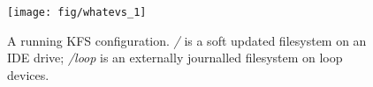\begin{figure}[htb]
  \centering
  \texttt{[image: fig/whatevs\_1]}
  \caption{A running KFS configuration. {\it/} is a soft updated
    filesystem on an IDE drive; {\it/loop} is an externally journalled
    filesystem on loop devices.}
  \label{fig:kfs-graph}
\end{figure}
